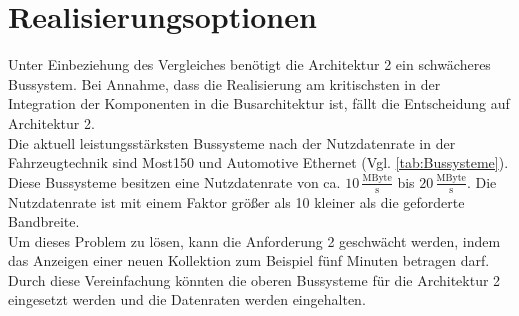 \section{Realisierungsoptionen}
Unter Einbeziehung des Vergleiches benötigt die Architektur 2 ein schwächeres Bussystem. Bei Annahme, dass die Realisierung am kritischsten in der Integration der Komponenten in die Busarchitektur ist, fällt die Entscheidung auf Architektur 2. \\
Die aktuell leistungsstärksten Bussysteme nach der Nutzdatenrate in der Fahrzeugtechnik sind Most150 und Automotive Ethernet (Vgl. \ref{tab:Bussysteme}). Diese Bussysteme besitzen eine Nutzdatenrate von ca. $ 10\,\frac{\mathrm{MByte}}{\mathrm{s}} $ bis $ 20\,\frac{\mathrm{MByte}}{\mathrm{s}} $. Die Nutzdatenrate ist mit einem Faktor größer als 10 kleiner als die geforderte Bandbreite. \\
Um dieses Problem zu lösen, kann die Anforderung 2 geschwächt werden, indem das Anzeigen einer neuen Kollektion zum Beispiel fünf Minuten betragen darf. Durch diese Vereinfachung könnten die oberen Bussysteme für die Architektur 2 eingesetzt werden und die Datenraten werden eingehalten. \\



